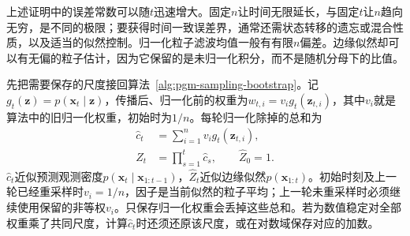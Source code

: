 上述证明中的误差常数可以随$t$迅速增大。固定$n$让时间无限延长，与固定$t$让$n$趋向无穷，是不同的极限；要获得时间一致误差界，通常还需状态转移的遗忘或混合性质，以及适当的似然控制。归一化粒子滤波均值一般有有限$n$偏差。边缘似然却可以有无偏的粒子估计，因为它保留的是未归一化积分，而不是随机分母下的比值。

先把需要保存的尺度接回算法~\ref{alg:pgm-sampling-bootstrap}。记$g_t(\bm z)=p(\bm x_t\mid\bm z)$，传播后、归一化前的权重为$w_{t,i}=v_i g_t(\bm z_{t,i})$，其中$v_i$就是算法中的旧归一化权重，初始时为$1/n$。每轮归一化除掉的总和为
\begin{equation}
  \begin{aligned}
    \widehat c_t&=\sum_{i=1}^n v_i g_t(\bm z_{t,i}),\\
    \widehat Z_t&=\prod_{s=1}^t\widehat c_s,\qquad \widehat Z_0=1.
  \end{aligned}
  \label{eq:pgm-sampling-evidence-product}
\end{equation}
$\widehat c_t$近似预测观测密度$p(\bm x_t\mid\bm x_{1:t-1})$，$\widehat Z_t$近似边缘似然$p(\bm x_{1:t})$。初始时刻及上一轮已经重采样时$v_i=1/n$，因子是当前似然的粒子平均；上一轮未重采样时必须继续使用保留的非等权$v_i$。只保存归一化权重会丢掉这些总和。若为数值稳定对全部权重乘了共同尺度，计算$\widehat c_t$时还须还原该尺度，或在对数域保存对应的加数。

